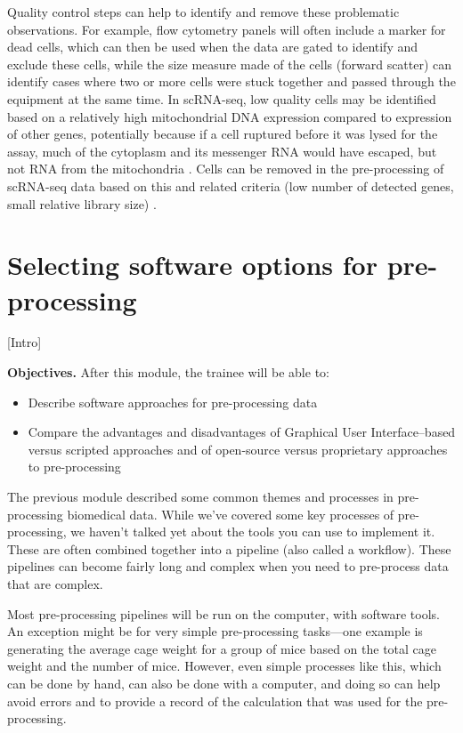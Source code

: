 \documentclass[]{tufte-book}
\providecommand{\tightlist}{%
  \setlength{\itemsep}{0pt}\setlength{\parskip}{0pt}}
\begin{document}
Quality control steps can help to identify and remove these problematic
observations. For example, flow cytometry panels will often include a marker for
dead cells, which can then be used when the data are gated to identify and
exclude these cells, while the size measure made of the cells (forward scatter)
can identify cases where two or more cells were stuck together and passed
through the equipment at the same time. In scRNA-seq, low quality cells may be
identified based on a relatively high mitochondrial DNA expression compared to
expression of other genes, potentially because if a cell ruptured before it was
lysed for the assay, much of the cytoplasm and its messenger RNA would have
escaped, but not RNA from the mitochondria \citep{ilicic2016classification}. Cells
can be removed in the pre-processing of scRNA-seq data based on this and related
criteria (low number of detected genes, small relative library size)
\citep{ilicic2016classification}.

\section{Selecting software options for pre-processing}\label{module12a}

{[}Intro{]}

\textbf{Objectives.} After this module, the trainee will be able to:

\begin{itemize}
\tightlist
\item
  Describe software approaches for pre-processing data
\item
  Compare the advantages and disadvantages of Graphical User Interface--based
  versus scripted approaches and of open-source versus proprietary approaches
  to pre-processing
\end{itemize}

The previous module described some common themes and processes in pre-processing
biomedical data. While we've covered some key processes of pre-processing, we
haven't talked yet about the tools you can use to implement it. These are often
combined together into a pipeline (also called a workflow). These pipelines can
become fairly long and complex when you need to pre-process data that are
complex.

Most pre-processing pipelines will be run on the computer, with software tools. An
exception might be for very simple pre-processing tasks---one example is
generating the average cage weight for a group of mice based on the total cage
weight and the number of mice. However, even simple processes like this, which
can be done by hand, can also be done with a computer, and doing so can help
avoid errors and to provide a record of the calculation that was used for the
pre-processing.
\end{document}
